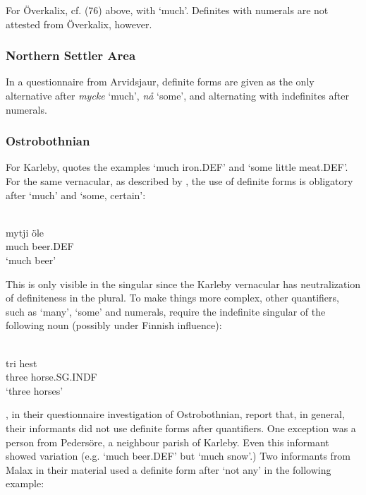 \z

For Överkalix, cf. (76) above, with ‘much’. Definites with numerals are not attested from Överkalix, however.

\subsubsection{Northern Settler Area}
In a questionnaire from Arvidsjaur, definite forms are given as the only alternative after \textit{mycke} ‘much’, \textit{nå} ‘some’, and alternating with indefinites after numerals.

\subsubsection{Ostrobothnian}
 For Karleby, \citet[94]{Hagfors1891} quotes the examples  ‘much iron.DEF’ and  ‘some little meat.DEF’. For the same vernacular, as described by \citet{Vangsnes2003}, the use of definite forms is obligatory after  ‘much’ and  ‘some, certain’:

\ea \label{} 
\\
\gll mytji  öle\\
much  beer.DEF\\
\glt ‘much beer’

\z

This is only visible in the singular since the Karleby vernacular has neutralization of definiteness in the plural. To make things more complex, other quantifiers, such as  ‘many’,  ‘some’ and numerals, require the indefinite singular of the following noun (possibly under Finnish influence):

\ea \label{} 
\\
\gll tri  hest\\
three  horse.SG.INDF\\
\glt ‘three horses’

\z

\citet[26]{ErikssonEtAl1999}, in their questionnaire investigation of Ostrobothnian, report that, in general, their informants did not use definite forms after quantifiers. One exception was a person from Pedersöre, a neighbour parish of Karleby. Even this informant showed variation (e.g.  ‘much beer.DEF’ but  ‘much snow’.) Two informants from Malax in their material used a definite form after  ‘not any’ in the following example:

